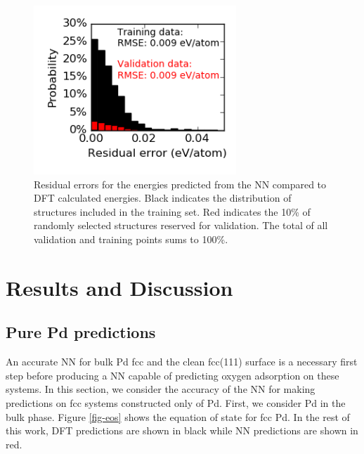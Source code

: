 \documentclass[12pt]{cmuthesis}
\begin{document}
\begin{figure}[htbp]
\centering
\includegraphics[width=3in]{./images/distribution.png}
\caption{\label{fig-residuals}
Residual errors for the energies predicted from the NN compared to DFT calculated energies. Black indicates the distribution of structures included in the training set. Red indicates the 10\% of randomly selected structures reserved for validation. The total of all validation and training points sums to 100\%.}
\end{figure}

\section{Results and Discussion}
\label{sec:orgcdd88ce}
\subsection{Pure Pd predictions}
\label{sec:org07e76b3}
An accurate NN for bulk Pd fcc and the clean fcc(111) surface is a necessary first step before producing a NN capable of predicting oxygen adsorption on these systems. In this section, we consider the accuracy of the NN for making predictions on fcc systems constructed only of Pd. First, we consider Pd in the bulk phase. Figure \ref{fig-eos} shows the equation of state for fcc Pd. In the rest of this work, DFT predictions are shown in black while NN predictions are shown in red.
\end{document}
